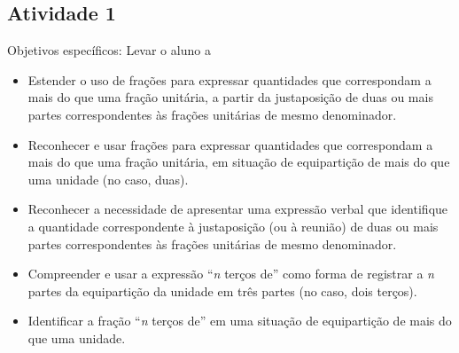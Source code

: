 \documentclass[oneside]{book}
\begin{document}
\begin{multicols}{2}


\subsection{Atividade 1}





  Objetivos específicos: Levar o aluno a
\begin{itemize} %
    \item       Estender o uso de frações para expressar quantidades que correspondam a mais do que uma fração unitária, a partir da justaposição de duas ou mais partes correspondentes às frações unitárias de mesmo denominador.
    \item       Reconhecer e usar frações para expressar quantidades que correspondam a mais do que uma fração unitária, em situação de equipartição de mais do que uma unidade (no caso, duas).
    \item       Reconhecer a necessidade de apresentar uma expressão verbal que identifique a quantidade correspondente à justaposição (ou à reunião) de duas ou mais partes correspondentes às frações unitárias de mesmo denominador.
    \item       Compreender e usar a expressão       ``{\it n} terços de''       como forma de registrar a       {\it n}       partes da equipartição da unidade em três partes (no caso, dois terços).
    \item       Identificar a fração       ``{\it n} terços de''       em uma situação de equipartição de mais do que uma unidade.
\end{itemize} %



\end{multicols}
\end{document}
